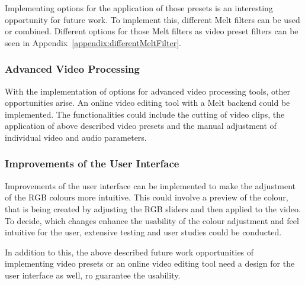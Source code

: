 \documentclass[../MasterThesis.tex]{subfiles}
\begin{document}
Implementing options for the application of those presets is an interesting opportunity for future work. To implement this, different Melt filters can be used or combined. Different options for those Melt filters as video preset filters can be seen in Appendix~\ref{appendix:differentMeltFilter}.













\subsubsection*{Advanced Video Processing}

With the implementation of options for advanced video processing tools, other opportunities arise. An online video editing tool with a Melt backend could be implemented. The functionalities could include the cutting of video clips, the application of above described video presets and the manual adjustment of individual video and audio parameters.










\subsubsection*{Improvements of the User Interface}


Improvements of the user interface can be implemented to make the adjustment of the RGB colours more intuitive. This could involve a preview of the colour, that is being created by adjusting the RGB sliders and then applied to the video.
To decide, which changes enhance the usability of the colour adjustment and feel intuitive for the user, extensive testing and user studies could be conducted.


In addition to this, the above described future work opportunities of implementing video presets or an online video editing tool need a design for the user interface as well, ro guarantee the usability. 
\end{document}
